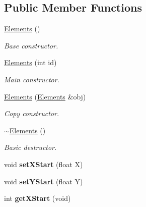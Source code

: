 \subsection*{Public Member Functions}
\begin{DoxyCompactItemize}
\item 
\hypertarget{class_elements_aaf76c70282b6997fc20f1d8c751d7146}{\hyperlink{class_elements_aaf76c70282b6997fc20f1d8c751d7146}{Elements} ()}\label{class_elements_aaf76c70282b6997fc20f1d8c751d7146}

\begin{DoxyCompactList}\small\item\em Base constructor. \end{DoxyCompactList}\item 
\hyperlink{class_elements_a15505a7088b59b169943cf0b3883d859}{Elements} (int id)
\begin{DoxyCompactList}\small\item\em Main constructor. \end{DoxyCompactList}\item 
\hyperlink{class_elements_a2a0658f7634191593c7d6eeab1556adc}{Elements} (\hyperlink{class_elements}{Elements} \&obj)
\begin{DoxyCompactList}\small\item\em Copy constructor. \end{DoxyCompactList}\item 
\hypertarget{class_elements_a28037b21a12317e69d6160da9f4844de}{\hyperlink{class_elements_a28037b21a12317e69d6160da9f4844de}{$\sim$\+Elements} ()}\label{class_elements_a28037b21a12317e69d6160da9f4844de}

\begin{DoxyCompactList}\small\item\em Basic destructor. \end{DoxyCompactList}\item 
\hypertarget{class_elements_a23add0eda070fb51f84eab6b94d5b886}{void {\bfseries set\+X\+Start} (float X)}\label{class_elements_a23add0eda070fb51f84eab6b94d5b886}

\item 
\hypertarget{class_elements_a2214c37dc1288a3763db6780bf7d6ee5}{void {\bfseries set\+Y\+Start} (float Y)}\label{class_elements_a2214c37dc1288a3763db6780bf7d6ee5}

\item 
\hypertarget{class_elements_a8215e9cba9658fc711cfec7cd0b70cd1}{int {\bfseries get\+X\+Start} (void)}\label{class_elements_a8215e9cba9658fc711cfec7cd0b70cd1}


\end{DoxyCompactItemize}
